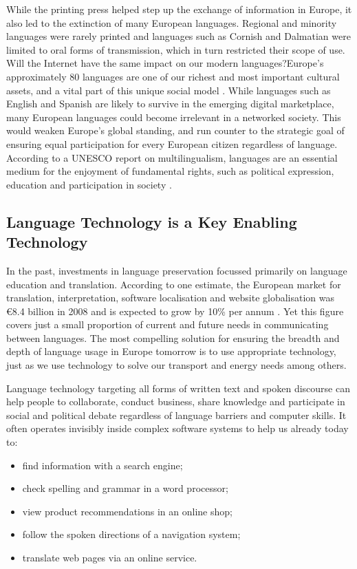 \documentclass{../../metanetpaper}
\begin{document}
\begin{multicols}{2}
While the printing press helped step up the exchange of information in Europe, it also led to the extinction of many European languages. Regional and minority languages were rarely printed and languages such as Cornish and Dalmatian were limited to oral forms of transmission, which in turn restricted their scope of use. Will the Internet have the same impact on our modern languages?Europe’s approximately 80 languages are one of our richest and most important cultural assets, and a vital part of this unique social model \cite{EC2}. While languages such as English and Spanish are likely to survive in the emerging digital marketplace, many European languages could become irrelevant in a networked society. This would weaken Europe’s global standing, and run counter to the strategic goal of ensuring equal participation for every European citizen regardless of language. According to a UNESCO report on multilingualism, languages are an essential medium for the enjoyment of fundamental rights, such as political expression, education and participation in society \cite{Unesco1}.

\subsection{Language Technology is a Key Enabling Technology}

In the past, investments in language preservation focussed primarily on language education and translation. According to one estimate, the European market for translation, interpretation, software localisation and website globalisation was €8.4 billion in 2008 and is expected to grow by 10\% per annum \cite{EC3}. Yet this figure covers just a small proportion of current and future needs in communicating between languages. The most compelling solution for ensuring the breadth and depth of language usage in Europe tomorrow is to use appropriate technology, just as we use technology to solve our transport and energy needs among others.

Language technology targeting all forms of written text and spoken discourse can help people to collaborate, conduct business, share knowledge and participate in social and political debate regardless of language barriers and computer skills. It often operates invisibly inside complex software systems to help us already today to:

\begin{itemize}
\item find information with a search engine;
\item check spelling and grammar in a word processor;
\item view product recommendations in an online shop;
\item follow the spoken directions of a navigation system;
\item translate web pages via an online service.
\end{itemize}


\end{multicols}
\end{document}
